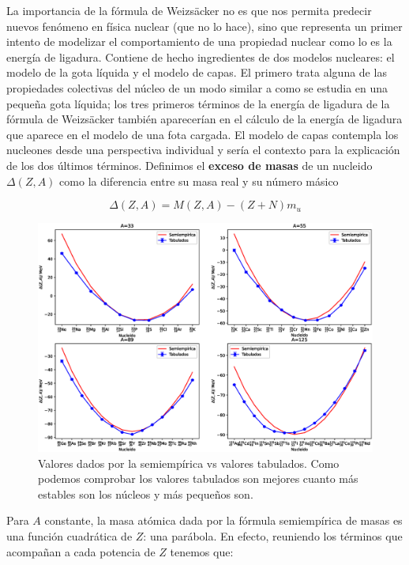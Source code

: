 La importancia de la fórmula de Weizsäcker no es que nos permita predecir nuevos fenómeno en física nuclear (que no lo hace), sino que representa un primer intento de modelizar el comportamiento de una propiedad nuclear como lo es la energía de ligadura. Contiene de hecho ingredientes de dos modelos nucleares: el modelo de la gota líquida y el modelo de capas. El primero trata alguna de las propiedades colectivas del núcleo de un modo similar a como se estudia en una pequeña gota líquida; los tres primeros términos de la energía de ligadura de la fórmula de Weizsäcker también aparecerían en el cálculo de la energía de ligadura que aparece en el modelo de una fota cargada. El modelo de capas contempla los nucleones desde una perspectiva individual y sería el contexto para la explicación de los dos últimos términos. Definimos el \textbf{exceso de masas} de un nucleido $\Delta(Z,A)$ como la diferencia entre su masa real y su número másico

\begin{equation}
	\Delta(Z,A) = M(Z,A) - (Z+N)m_u
\end{equation}

\begin{figure}[h!] \centering
	 \includegraphics[width=\textwidth]{Imagenes/Parabola_masas.eps}
	 \caption{Valores dados por la semiempírica vs valores tabulados. Como podemos comprobar los valores tabulados son mejores cuanto más estables son los núcleos y más pequeños son.}
\end{figure}
Para $A$ constante, la masa atómica dada por la fórmula semiempírica de masas es una función cuadrática de $Z$: una parábola. En efecto, reuniendo los términos que acompañan a cada potencia de $Z$ tenemos que:

